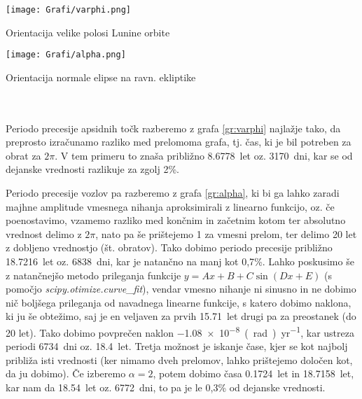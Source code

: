 \documentclass{article}
\begin{document}
\begin{minipage}[t]{0.45\textwidth}
    \begin{graph}
    \centering
    \texttt{[image: Grafi/varphi.png]}
    \captionsetup{width=.8\linewidth}
    \caption{Orientacija velike polosi Lunine orbite}
    \label{gr:varphi}
\end{graph}
\end{minipage}\begin{minipage}[t]{0.45\textwidth}
    \begin{graph}
    \centering
    \texttt{[image: Grafi/alpha.png]}
    \captionsetup{width=.8\linewidth}
    \caption{Orientacija normale elipse na ravn. ekliptike}
    \label{gr:alpha}
\end{graph}
\end{minipage}\\\\

Periodo precesije apsidnih točk razberemo z grafa \ref{gr:varphi} najlažje tako, da preprosto izračunamo razliko med prelomoma grafa, tj. čas, ki je bil potreben za obrat za $2\pi$. V tem primeru to znaša približno \SI{8,6778}{let} oz. \SI{3170}{dni}, kar se od dejanske vrednosti razlikuje za zgolj 2\%.

Periodo precesije vozlov pa razberemo z grafa \ref{gr:alpha}, ki bi ga lahko zaradi majhne amplitude vmesnega nihanja aproksimirali z linearno funkcijo, oz. če poenostavimo, vzamemo razliko med končnim in začetnim kotom ter absolutno vrednost delimo z $2\pi$, nato pa še prištejemo 1 za vmesni prelom, ter delimo 20 let z dobljeno vrednostjo (št. obratov). Tako dobimo periodo precesije približno \SI{18,7216}{let} oz. \SI{6838}{dni}, kar je natančno na manj kot {0,7}\%. Lahko poskusimo še z natančnejšo metodo prileganja funkcije $y=Ax+B+C\sin(Dx+E)$ (s pomočjo \textit{scipy.otimize.curve\_fit}), vendar vmesno nihanje ni sinusno in ne dobimo nič boljšega prileganja od navadnega linearne funkcije, s katero dobimo naklona, ki ju še obtežimo, saj je en veljaven za prvih \SI{15,71}{let} drugi pa za preostanek (do 20 let). Tako dobimo povprečen naklon \SI{-1,08e-8}{(rad)\per yr}, kar ustreza periodi \SI{6734}{dni} oz. \SI{18,4}{let}. Tretja možnost je iskanje čase, kjer se kot najbolj približa isti vrednosti (ker nimamo dveh prelomov, lahko prištejemo določen kot, da ju dobimo). Če izberemo $\alpha=2$, potem dobimo časa \SI{0,1724}{let} in \SI{18,7158}{let}, kar nam da \SI{18,54}{let} oz. \SI{6772}{dni}, to pa je le {0,3}\% od dejanske vrednosti.
\end{document}
